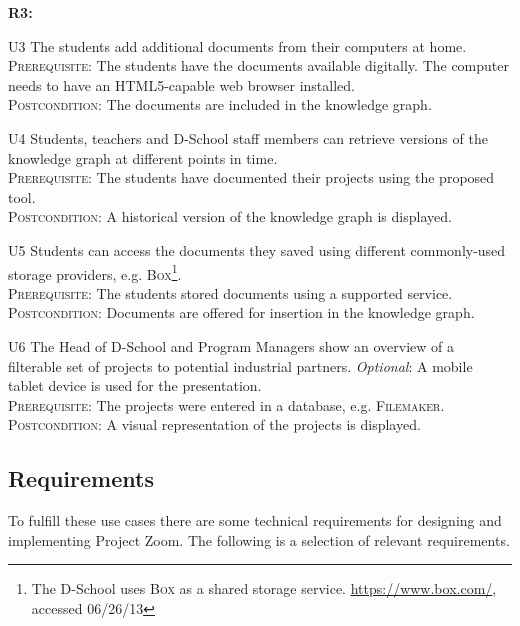 \begin{labeling}{\textbf{R3:}}

\item[U3\label{uc:fromhome}] The students add additional documents from their computers at home.\\
\textsc{Prerequisite}: The students have the documents available digitally. The computer needs to have an HTML5-capable web browser installed.\\
\textsc{Postcondition}: The documents are included in the knowledge graph.


\item[U4\label{uc:versions}] Students, teachers and D-School staff members can retrieve versions of the knowledge graph at different points in time.\\
\textsc{Prerequisite}: The students have documented their projects using the proposed tool.\\
\textsc{Postcondition}: A historical version of the knowledge graph is displayed.

\item[U5\label{uc:storageproviders}] Students can access the documents they saved using different commonly-used storage pro\-vi\-ders, e.g. \textsc{Box}\footnote{The D-School uses \textsc{Box} as a shared storage service. \url{https://www.box.com/}, accessed 06/26/13}.\\
\textsc{Prerequisite}: The students stored documents using a supported service.\\
\textsc{Postcondition}: Documents are offered for insertion in the knowledge graph.
\item[U6\label{uc:multiplatform}] The Head of D-School and Program Managers show an overview of a filterable set of pro\-jects to potential industrial partners. \textit{Optional}:  A mobile tablet device is used for the presentation.\\
\textsc{Prerequisite}: The projects were entered in a database, e.g. \textsc{Filemaker}.\\
\textsc{Postcondition}: A visual representation of the projects is displayed.
\end{labeling}

\subsection{Requirements}

To fulfill these use cases there are some technical requirements for designing and implementing Project Zoom. The following is a selection of relevant requirements.

